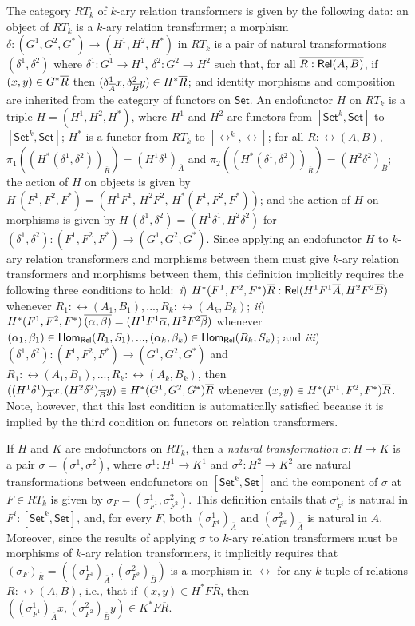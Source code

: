 \documentclass[runningheads]{llncs}
\newcommand{\set}{\mathsf{Set}}
\begin{document}
The category $RT_k$ of $k$-ary relation transformers is given by the
following data: an object of $RT_k$ is a $k$-ary relation transformer;
a morphism $\delta : (G^1,G^2,G^*) \to (H^1,H^2,H^*)$ in $RT_k$ is a
pair of natural transformations $(\delta^1, \delta^2)$ where $\delta^1
: G^1 \to H^1$, $\delta^2 : G^2 \to H^2$ such that, for all $\overline{R :
  \mathsf{Rel}(A, B)}$, if $(x, y) \in G^*\overline{R}$ then $(\delta^1_{\overline{A}}x,
\delta^2_{\overline{B}}y) \in H^*\overline{R}$; and identity morphisms and
composition are inherited from the category of functors on $\set$.  An
endofunctor $H$ on $RT_k$ is a triple $H = (H^1,H^2,H^*)$, where $H^1$
and $H^2$ are functors from $[\set^k,\set]$ to $[\set^k,\set]$; $H^*$
is a functor from $RT_k$ to $[\rel^k,\rel]$; for all $\overline{R :
  \rel(A,B)}$, $\pi_1((H^*(\delta^1,\delta^2))_{\overline{R}}) = (H^1
\delta^1)_{\overline{A}}$ and
$\pi_2((H^*(\delta^1,\delta^2))_{\overline{R}}) = (H^2
\delta^2)_{\overline{B}}$; the action of $H$ on objects is given by
$H\,(F^1,F^2,F^*) = (H^1F^1,\,H^2F^2,\,H^*(F^1,F^2,F^*))$; and the
action of $H$ on morphisms is given by $H\,(\delta^1,\delta^2) =
(H^1\delta^1,H^2\delta^2)$ for $(\delta^1,\delta^2) : (F^1,F^2,F^*)\to
(G^1,G^2,G^*)$.  Since applying an endofunctor $H$ to $k$-ary relation
transformers and morphisms between them must give $k$-ary relation
transformers and morphisms between them, this definition implicitly
requires the following three conditions to hold: \,{\em i})
$H^*(F^1,F^2,F^*) \overline{R} : \mathsf{Rel}(H^1F^1 \overline{A}, H^2F^2 \overline{B})$
whenever $R_1:\rel(A_1,B_1),...,R_k:\rel(A_k,B_k)$; {\em ii})
$H^*(F^1,F^2,F^*)\, \overline{(\alpha, \beta)} = (H^1F^1\overline{\alpha}, H^2F^2
\overline{\beta})$ whenever $(\alpha_1, \beta_1) \in \mathsf{Hom_{Rel}}(R_1,S_1),...,
(\alpha_k, \beta_k) \in \mathsf{Hom_{Rel}}(R_k,S_k)$; and {\em iii}) $(\delta^1,\delta^2) : 
(F^1,F^2,F^*)\to (G^1,G^2,G^*)$ and
$R_1:\rel(A_1,B_1),...,R_k:\rel(A_k,B_k)$, then
$((H^1\delta^1)_{\overline{A}}x, (H^2\delta^2)_{\overline{B}}y) \in
H^*(G^1,G^2,G^*)\overline{R}$ whenever $(x, y) \in
H^*(F^1,F^2,F^*)\overline{R}$. Note, however, that this last condition is
automatically satisfied because it is implied by the third condition
on functors on relation transformers.

If $H$ and $K$ are endofunctors on $RT_k$, then a {\em natural
  transformation} $\sigma : H \to K$ is a pair $\sigma = (\sigma^1,
\sigma^2)$, where $\sigma^1 : H^1 \to K^1$ and $\sigma^2 : H^2 \to
K^2$ are natural transformations between endofunctors on
$[\set^k,\set]$ and the component of $\sigma$ at $F \in RT_k$ is given
by $\sigma_F = (\sigma^1_{F^1}, \sigma^2_{F^2})$.  This definition
entails that $\sigma^i_{F^i}$ is natural in $F^i : [\set^k,\set]$,
and, for every $F$, both $(\sigma^1_{F^1})_{\overline{A}}$ and
$(\sigma^2_{F^2})_{\overline{A}}$ is natural in $\overline{A}$.
Moreover, since the results of applying $\sigma$ to $k$-ary relation
transformers must be morphisms of $k$-ary relation transformers, it
implicitly requires that $(\sigma_F)_{\overline{R}} = (
(\sigma^1_{F^1})_{\overline{A}}, (\sigma^2_{F^2})_{\overline{B}})$ is
a morphism in $\rel$ for any $k$-tuple of relations $\overline{R :
  \rel(A, B)}$, i.e., that if $(x, y) \in H^*F\overline{R}$, then
$((\sigma^1_{F^1})_{\overline{A}} x, (\sigma^2_{F^2})_{\overline{B}}
y) \in K^*F\overline{R}$.
\end{document}
